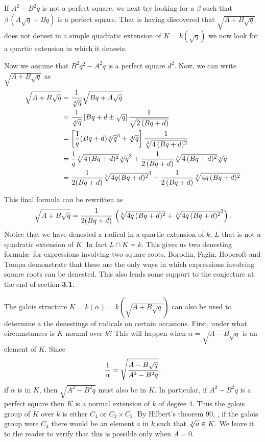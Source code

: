 If $A^2 - B^2 q$ is not a perfect square, we next try looking for a
$\beta$ such that $\beta\,(A \sqrt{q} + B q)$ is a perfect square.  That
is having discovered that $\sqrt{A + B \sqrt{q}}$ does not denest in a
simple quadratic extension of $K = k(\sqrt{q})$ we now look for a
quartic extension in which it denests.

Now we assume that $B^2 q^2 - A^2 q$ is a perfect square $d^2$.  Now, we
can write $\sqrt{A + B \sqrt{q}}$ as
\[
\begin{aligned}
\sqrt{A + B \sqrt{q}} & 
= {1 \over \root 4 \of q} \sqrt{B q + A \sqrt{q}}\\
&= {1 \over \root 4 \of q} \left[ Bq + d \pm \sqrt{q} \right]
{1 \over \sqrt{2\,(B q + d)}}\\
&=\left[{1 \over q} (Bq + d) {\root 4 \of q}^3 + {\root 4 \of q}\right]
{1 \over \root 4 \of{4\,(B q + d)^2}}\\
&={1 \over q} {\root 4\of{4\,(Bq +d)^2}} {\root 4\of q}^3
+ {1 \over 2\,(Bq+d)} {\root 4\of{4\,(Bq+d)^2}} {\root 4\of q}\\
&= {1 \over 2 (Bq +d)} {\root 4 \of{4 q(Bq+d)^2}}^3 +
{1 \over 2\,(Bq+d)} \root 4\of{4 q\,(Bq+d)^2}
\end{aligned}
\]

This final formula can be rewritten as 
\[
\sqrt{A + B \sqrt{q}} = 
{1 \over 2 (Bq + d)} \,\left( \root 4\of{4q\,(Bq+d)^2} + 
{\root 4\of{4q\,(Bq+d)^2}}^3 \right).
\]
Notice that we have denested a radical in a quartic extension of $k$,
$L$ that is not a quadratic extension of $K$.  In fact $L \cap K = k$.
This gives us two denesting formul\ae\ for expressions involving two
square roots.  Borodin, Fagin, Hopcroft and Tompa
\cite{Borodin:Radicals} demonstrate that these are the only ways in
which expressions involving square roots can be denested.  This also
lends some support to the conjecture at the end of section {\bf 3.1}.

\medskip
The galois structure $K = k(\alpha) = k(\sqrt{A+B \sqrt{q}})$ can also
be used to determine a the denestings of radicals on certain occasions.
First, under what circumstances is $K$ normal over $k$?  This will
happen when $\bar \alpha = \sqrt{A - B\sqrt{q}}$ is an element of $K$.
Since 
\[
{1 \over \alpha} = \sqrt{A - B \sqrt{q} \over A^2 - B^2 q},
\]
if $\bar \alpha$ is in $K$, then $\sqrt{A^2-B^2 q}$ must also be in $K$.
In particular, if $A^2 - B^2 q$ is a perfect square then $K$ is a normal
extension of $k$ of degree 4.  Thus the galois group of $K$ over $k$ is
either $C_4$ or $C_2 \times C_2$.  By Hilbert's theorem 90,
, if the galois group were $C_4$ there
would be an element $a$ in $k$ such that $\root 4\of a \in K$.  We
leave it to the reader to verify that this is possible only when $A = 0$.

